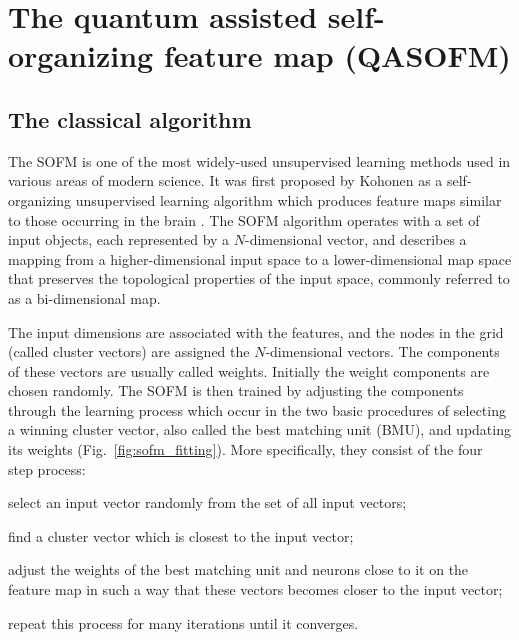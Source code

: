 \documentclass[pra,showkeys,twocolumn,showpacs]{revtex4-1}
\begin{document}
\section{The quantum assisted self-organizing feature map (QASOFM)}
\label{sec:qasofm}



\subsection{The classical algorithm}


The SOFM is one of the most widely-used unsupervised learning methods used in various areas of modern science.
It was first proposed by Kohonen as a self-organizing unsupervised learning algorithm which produces feature maps similar to those occurring in the brain \cite{solan2001}.
The SOFM algorithm operates with a set of input objects, each represented by a $N$-dimensional vector,
and describes a mapping from a higher-dimensional input space to a lower-dimensional map space that preserves the topological properties of the input space, commonly referred to as a bi-dimensional map.

The input dimensions are associated with the features,
and the nodes in the grid (called cluster vectors) are assigned the $N$-dimensional vectors.
The components of these vectors are usually called weights.
Initially the weight components are chosen randomly.
The SOFM is then trained by adjusting the components through the learning process which occur in the two basic procedures of
selecting a winning cluster vector, also called the best matching unit (BMU), and updating its weights (Fig.~\ref{fig:sofm_fitting}).
More specifically, they consist of the four step process:
\begin{enumerate*}
\item select an input vector randomly from the set of all input vectors;
\item find a cluster vector which is closest to the input vector;
\item adjust the weights of the best matching unit and neurons close to it on the feature map in such a way
	that these vectors  becomes closer to the input vector;
\item repeat this process for many iterations until it converges.
\end{enumerate*}
\end{document}
